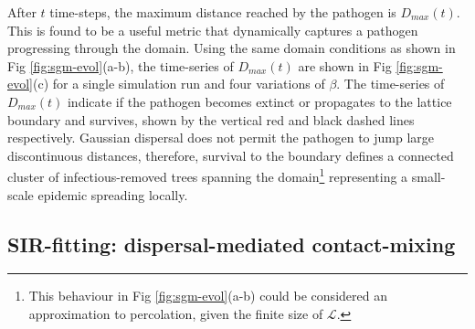 After $t$ time-steps, the maximum distance reached by the pathogen is $D_{max}(t)$. This is found to be a useful metric that dynamically captures a pathogen progressing through the domain. Using the same domain conditions as shown in Fig \ref{fig:sgm-evol}(a-b), the time-series of $D_{max}(t)$ are shown in Fig \ref{fig:sgm-evol}(c) for a single simulation run and four variations of $\beta$. The time-series of $D_{max}(t)$ indicate if the pathogen becomes extinct or propagates to the lattice boundary and survives, shown by the vertical red and black dashed lines respectively. Gaussian dispersal does not permit the pathogen to jump large discontinuous distances, therefore, survival to the boundary defines a connected cluster of infectious-removed trees spanning the domain\footnote{This behaviour in Fig \ref{fig:sgm-evol}(a-b) could be considered an approximation to percolation, given the finite size of $\mathcal{L}$.} representing a small-scale epidemic spreading locally.\\




\subsection{SIR-fitting: dispersal-mediated contact-mixing}

